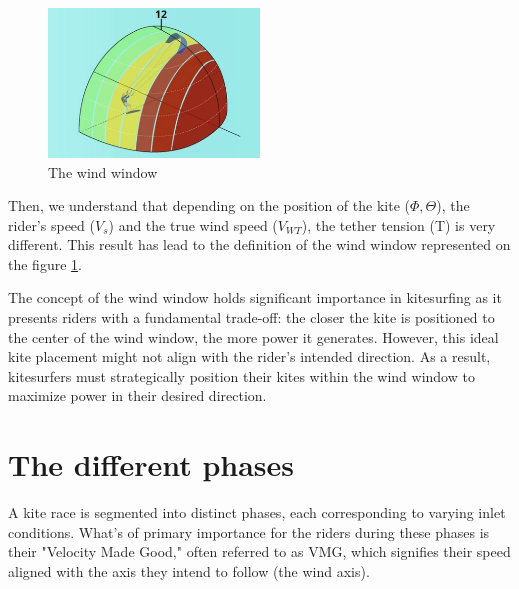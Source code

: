 \begin{figure}
\centering
    \includegraphics[width=0.5\textwidth]{figures/2D steady simulations/kite flight modeling 3.png}
    \caption{The wind window}
    \label{fig:The_wind_window}
\end{figure}

Then, we understand that depending on the position of the kite ($\Phi, \Theta$), the rider's speed ($V_{s}$) and the true wind speed ($V_{WT}$), the tether tension (T) is very different. This result has lead to the definition of the wind window represented on the figure \ref{fig:The_wind_window}.

The concept of the wind window holds significant importance in kitesurfing as it presents riders with a fundamental trade-off: the closer the kite is positioned to the center of the wind window, the more power it generates. However, this ideal kite placement might not align with the rider's intended direction. As a result, kitesurfers must strategically position their kites within the wind window to maximize power in their desired direction.


\section{The different phases}
\label{sec:Ch1.3}

A kite race is segmented into distinct phases, each corresponding to varying inlet conditions. What's of primary importance for the riders during these phases is their "Velocity Made Good," often referred to as VMG, which signifies their speed aligned with the axis they intend to follow (the wind axis).

